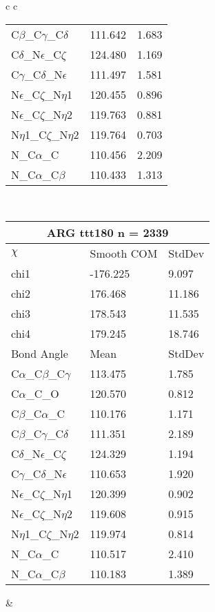 \begin{longtable}{ c c }
\begin{tabular}{ l l l }
  C$\beta$\_C$\gamma$\_C$\delta$ & 111.642 & 1.683\\
  C$\delta$\_N$\epsilon$\_C$\zeta$ & 124.480 & 1.169\\
  C$\gamma$\_C$\delta$\_N$\epsilon$ & 111.497 & 1.581\\
  N$\epsilon$\_C$\zeta$\_N$\eta$1 & 120.455 & 0.896\\
  N$\epsilon$\_C$\zeta$\_N$\eta$2 & 119.763 & 0.881\\
  N$\eta$1\_C$\zeta$\_N$\eta$2 & 119.764 & 0.703\\
  N\_C$\alpha$\_C & 110.456 & 2.209\\
  N\_C$\alpha$\_C$\beta$ & 110.433 & 1.313\\
  \bottomrule
  \end{tabular}
  \\
  \begin{tabular}{ l l l }
  \toprule
  \multicolumn{3}{c}{ARG \textbf{ttt180} n = 2339} \\ \toprule
  $\chi$       & Smooth COM & StdDev \\ \midrule
  chi1 & -176.225 & 9.097 \\ 
  chi2 & 176.468 & 11.186 \\ 
  chi3 & 178.543 & 11.535 \\ 
  chi4 & 179.245 & 18.746 \\ \midrule
  Bond Angle   & Mean     & StdDev \\ \midrule
  C$\alpha$\_C$\beta$\_C$\gamma$ & 113.475 & 1.785\\
  C$\alpha$\_C\_O & 120.570 & 0.812\\
  C$\beta$\_C$\alpha$\_C & 110.176 & 1.171\\
  C$\beta$\_C$\gamma$\_C$\delta$ & 111.351 & 2.189\\
  C$\delta$\_N$\epsilon$\_C$\zeta$ & 124.329 & 1.194\\
  C$\gamma$\_C$\delta$\_N$\epsilon$ & 110.653 & 1.920\\
  N$\epsilon$\_C$\zeta$\_N$\eta$1 & 120.399 & 0.902\\
  N$\epsilon$\_C$\zeta$\_N$\eta$2 & 119.608 & 0.915\\
  N$\eta$1\_C$\zeta$\_N$\eta$2 & 119.974 & 0.814\\
  N\_C$\alpha$\_C & 110.517 & 2.410\\
  N\_C$\alpha$\_C$\beta$ & 110.183 & 1.389\\
  \bottomrule
  \end{tabular}
  &
  \begin{tabular}{ l l l }

\end{tabular}
\end{longtable}
